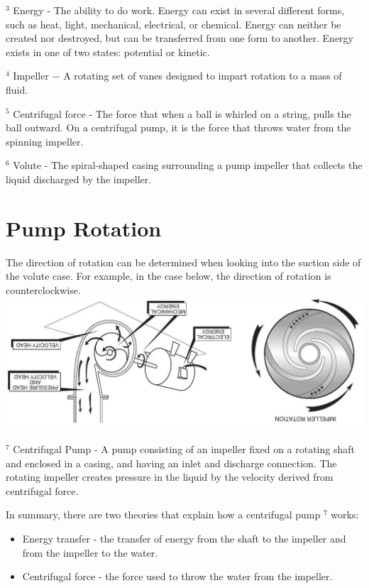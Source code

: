 \documentclass[10pt]{article}
\begin{document}
${ }^{3}$ Energy - The ability to do work. Energy can exist in several different forms, such as heat, light, mechanical, electrical, or chemical. Energy can neither be created nor destroyed, but can be transferred from one form to another. Energy exists in one of two states: potential or kinetic.

${ }^{4}$ Impeller $-$ A rotating set of vanes designed to impart rotation to a mass of fluid.

${ }^{5}$ Centrifugal force - The force that when a ball is whirled on a string, pulls the ball outward. On a centrifugal pump, it is the force that throws water from the spinning impeller.

${ }^{6}$ Volute - The spiral-shaped casing surrounding a pump impeller that collects the liquid discharged by the impeller.

\section{Pump Rotation}
The direction of rotation can be determined when looking into the suction side of the volute case. For example, in the case below, the direction of rotation is counterclockwise.\\

\includegraphics[max width=\textwidth]{CentrifugalPumpRotation}

${ }^{7}$ Centrifugal Pump - A pump consisting of an impeller fixed on a rotating shaft and enclosed in a casing, and having an inlet and discharge connection. The rotating impeller creates pressure in the liquid by the velocity derived from centrifugal force.

In summary, there are two theories that explain how a centrifugal pump ${ }^{7}$ works:

\begin{itemize}
  \item Energy transfer - the transfer of energy from the shaft to the impeller and from the impeller to the water.

  \item Centrifugal force - the force used to throw the water from the impeller.

\end{itemize}
\end{document}
